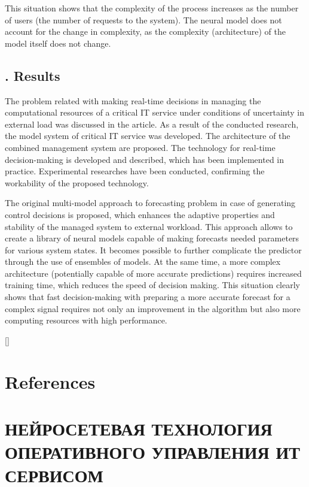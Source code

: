 \documentclass[a4paper,8pt]{article}
\begin{document}
\begin{multicols}{2}
This situation shows that the complexity of the process increases as the number of users (the number of requests to the system). The neural model does not account for the change in complexity, as the complexity (architecture) of the model itself does not change.

\subsection*{\centering \MakeUppercase{}. Results}

The problem related with making real-time decisions in managing the computational resources of a critical IT service under conditions of uncertainty in external load was discussed in the article. As a result of the conducted research, the model system of critical IT service was developed. The architecture of the combined management system are proposed. The technology for real-time decision-making is developed and described, which has been implemented in practice. Experimental researches have been conducted, confirming the workability of the proposed technology.

The original multi-model approach to forecasting problem in case of generating control decisions is proposed, which enhances the adaptive properties and stability of the managed system to external workload. This approach allows to create a library of neural models capable of making forecasts needed parameters for various system states. It becomes possible to further complicate the predictor through the use of ensembles of models. At the same time, a more complex architecture (potentially capable of more accurate predictions) requires increased training time, which reduces the speed of decision making. This situation clearly shows that fast decision-making with preparing a more accurate forecast for a complex signal requires not only an improvement in the algorithm but also more computing resources with high performance.

\nocite{*}
[\refname]{\section*{\centering References}}

\printbibliography %

\section*{\centering НЕЙРОСЕТЕВАЯ ТЕХНОЛОГИЯ ОПЕРАТИВНОГО УПРАВЛЕНИЯ ИТ СЕРВИСОМ}


\end{multicols}
\end{document}
